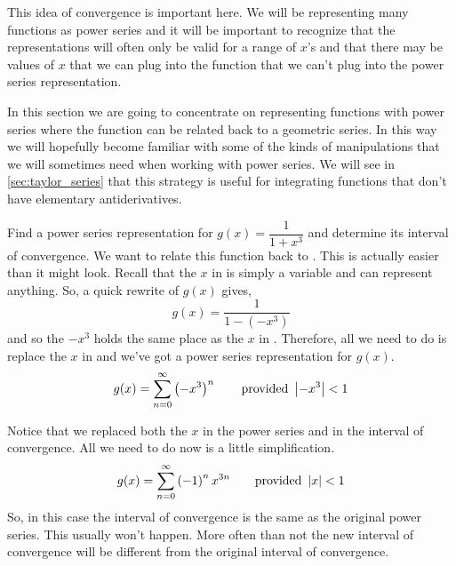 This idea of convergence is important here.  We will be representing many functions as power series and it will be important to recognize that the representations will often only be valid for a range of $x$'s and that there may be values of $x$ that we can plug into the function that we can't plug into the power series representation.

In this section we are going to concentrate on representing functions with power series where the function can be related back to a geometric series. In this way we will hopefully become familiar with some of the kinds of manipulations that we will sometimes need when working with power series. We will see in \autoref{sec:taylor_series} that this strategy is useful for integrating functions that don't have elementary antiderivatives.



\begin{example}\label{ex_power_cube}%
Find a power series representation for $g(x) = \dfrac1{1+x^3}$ and determine its interval of convergence.
\solution
We want to relate this function back to .  This is actually easier than it might look.  Recall that the $x$ in  is simply a variable and can represent anything.  So, a quick rewrite of $g(x)$ gives,
\[g(x)=\frac1{1-(-x^3)}\]
and so the $-x^3$ holds the same place as the $x$ in .  Therefore, all we need to do is replace the $x$ in  and we've got a power series representation for $g(x)$.  
\[g(x)=\sum_{n=0}^{\infty}\left( -x^3 \right)^n \qquad \text{provided }\left\lvert -x^3 \right\rvert<1\]

Notice that we replaced both the $x$ in the power series and in the interval of convergence. All we need to do now is a little simplification.
\[g(x)=\sum_{n=0}^{\infty}\left( -1 \right)^n x^{3n} \qquad\text{provided }\left\lvert x \right\rvert<1\]
So, in this case the interval of convergence is the same as the original power series.  This usually won't happen.  More often than not the new interval of convergence will be different from the original interval of convergence.
\end{example}


